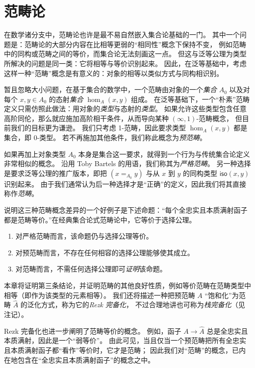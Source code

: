 \chapter{范畴论}
\label{cha:category-theory}

在数学诸分支中，范畴论也许是最不易自然嵌入集合论基础的一门。
其中一个问题是：范畴论的大部分内容在比相等更弱的“相同性”概念下保持不变，
例如范畴中的同构或范畴之间的等价，而集合论无法刻画这一点。
但这与泛等公理为类型所解决的问题是同一类：它将相等与等价识别起来。
因此，在泛等基础中，考虑这样一种“范畴”概念是有意义的：对象的相等以类似方式与同构相识别。

暂且忽略大小问题，在基于集合的数学中，一个范畴由对象的一个\emph{集合} $A_0$ 以及对每个 $x,y\in A_0$ 的态射\emph{集合} $\hom_A(x,y)$ 组成。
在泛等基础下，一个“朴素”范畴定义只需仿照此做法：用对象的\emph{类型}与态射的\emph{类型}。
如果允许这些类型包含任意高阶同伦，那么就应施加高阶相干条件，从而导向某种 $(\infty,1)$-范畴概念，
%
但目前我们的目标更为谦逊。
我们只考虑 1-范畴，因此要求类型 $\hom_A(x,y)$ 都是集合，即 0-类型。
若不再施加其他条件，我们称此概念为\emph{预范畴}。

如果再加上对象类型 $A_0$ 本身是集合这一要求，就得到一个行为与传统集合论定义非常相似的概念。
沿用 Toby Bartels 的用语，我们称其为\emph{严格范畴}。
%
另一种选择是要求泛等公理的推广版本，即把 $(x=_{A_0} y)$ 与从 $x$ 到 $y$ 的同构类型 $\mathsf{iso}(x,y)$ 识别起来。
由于我们通常认为后一种选择才是“正确”的定义，因此我们将其直接称作\emph{范畴}。

说明这三种范畴概念差异的一个好例子是下述命题：“每个全忠实且本质满射函子都是范畴等价。”在经典集合论式范畴论中，它等价于选择公理。
%
%
%
\begin{enumerate}
\item 对严格范畴而言，该命题仍与选择公理等价。
\item 对预范畴而言，不存在任何相容的选择公理能够使其成立。
\item 对范畴而言，不需任何选择公理即可\emph{证明}该命题。
\end{enumerate}
本章将证明第三条结论，并证明范畴的其他良好性质，例如等价范畴在范畴类型中相等（即作为该类型的元素相等）。
我们还将描述一种把预范畴 $A$ “饱和化”为范畴 $\widehat A$ 的泛化方式，称为它的\emph{Rezk 完备化}，
%
不过合理地讲也可称为\emph{栈完备化}（见注记）。

Rezk 完备化也进一步阐明了范畴等价的概念。
例如，函子 $A \to \widehat{A}$ 总是全忠实且本质满射，因此是一个“弱等价”。
由此可见，当且仅当一个预范畴把所有全忠实且本质满射函子都“看作”等价时，它才是范畴；
因此我们对“范畴”的概念，已内在地包含在“全忠实且本质满射函子”的概念之中。

